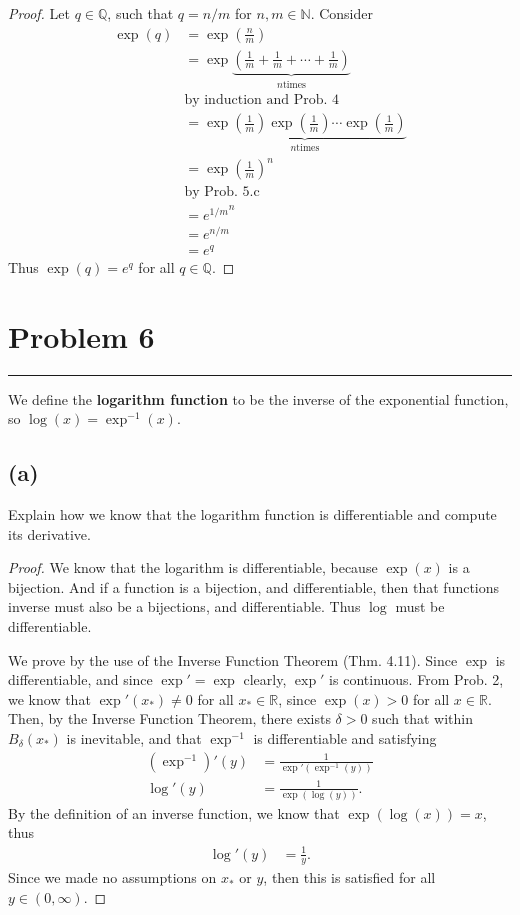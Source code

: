 \documentclass[12pt]{amsart}
\newcommand{\usec}[1]{%
  \section*{#1}%
  \noindent\rule{\textwidth}{2pt}%
  \vspace{10pt}%
}
\newcommand{\prob}[1]{Prob. #1}
\newcommand{\thm}[1]{Thm. #1}
\newcommand{\N}{\mathbb{N}}
\newcommand{\R}{\mathbb{R}}
\newcommand{\Q}{\mathbb{Q}}
\begin{document}
  \begin{proof}
    Let $q\in\Q$, such that $q=n/m$ for $n,m\in\N$. Consider
    \begin{align*}
      \exp(q)&=\exp\left(\frac{n}{m}\right)\\
             &=\exp\underbrace{\left(\frac{1}{m}+\frac{1}{m}+\cdots+\frac{1}{m}\right)}_\text{$n$
             times}\\
             &\text{by induction and \prob{4}}\\
             &=\underbrace{\exp\left(\frac{1}{m}\right)\exp\left(\frac{1}{m}\right)\cdots\exp\left(\frac{1}{m}\right)}_\text{$n$
             times}\\
             &=\exp\left(\frac{1}{m}\right)^n\\
             &\text{by \prob{5.c}}\\
             &={e^{1/m}}^n\\
             &=e^{n/m}\\
             &=e^q
    \end{align*}
    Thus $\exp(q)=e^q$ for all $q\in\Q$.
  \end{proof}

  \usec{Problem 6}%
  \label{sec:problem_6}

  We define the \textbf{logarithm function} to be the inverse of the exponential
  function, so $\log(x)=\exp^{-1}(x)$.

  \subsection*{(a)}%
  \label{sub:_a_}

  Explain how we know that the logarithm function is differentiable and compute
  its derivative.

  \begin{proof}
    We know that the logarithm is differentiable, because $\exp(x)$ is a
    bijection. And if a function is a bijection, and differentiable, then that
    functions inverse must also be a bijections, and differentiable. Thus $\log$
    must be differentiable.

    We prove by the use of the Inverse Function Theorem (\thm{4.11}). Since
    $\exp$ is differentiable, and since $\exp'=\exp$ clearly, $\exp'$ is
    continuous. From \prob{2}, we know that $\exp'(x_*)\neq 0$ for all $x_*\in\R$,
    since $\exp(x)>0$ for all $x\in\R$. Then, by the Inverse Function Theorem,
    there exists $\delta>0$ such that within $B_\delta(x_*)$ is inevitable, and
    that $\exp^{-1}$ is differentiable and satisfying
    \begin{align*}
      (\exp^{-1})'(y)&=\frac{1}{\exp'(\exp^{-1}(y))}\\
      \log'(y)&=\frac{1}{\exp(\log(y))}.
    \end{align*}
    By the definition of an inverse function, we know that $\exp(\log(x))=x$,
    thus
    \begin{align*}
      \log'(y)&=\frac{1}{y}.
    \end{align*}
    Since we made no assumptions on $x_*$ or $y$, then this is satisfied for all
    $y\in(0,\infty)$.
  \end{proof}
\end{document}
